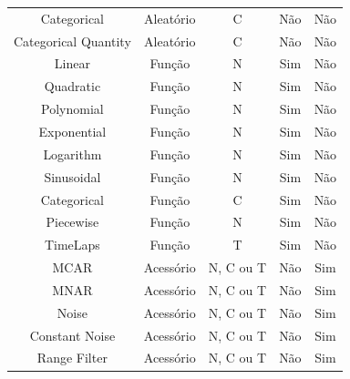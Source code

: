 \documentclass[
	12pt,				%
	openright,			%
	oneside,			%
	a4paper,			%
	english,			%
	brazil				%
	]{abntex2}
\begin{document}
\begin{table}[h]
\begin{tabular}{c|c|c|c|c}
				Categorical          & Aleatório  & C                                         & Não        & Não \\
				Categorical Quantity & Aleatório  & C                                         & Não        & Não \\
				Linear               & Função     & N                                         & Sim        & Não \\
				Quadratic            & Função     & N                                         & Sim        & Não \\
				Polynomial           & Função     & N                                         & Sim        & Não \\
				Exponential          & Função     & N                                         & Sim        & Não \\
				Logarithm            & Função     & N                                         & Sim        & Não \\
				Sinusoidal           & Função     & N                                         & Sim        & Não \\
				Categorical          & Função     & C                                         & Sim        & Não \\
				Piecewise            & Função     & N                                         & Sim        & Não \\
				TimeLaps             & Função     & T                                         & Sim        & Não \\
				MCAR                 & Acessório  & N, C ou T & Não        & Sim \\
				MNAR                 & Acessório  & N, C ou T & Não        & Sim \\
				Noise                & Acessório  & N, C ou T & Não        & Sim \\
				Constant Noise       & Acessório  & N, C ou T & Não        & Sim \\
				Range Filter         & Acessório  & N, C ou T & Não        & Sim \\

\end{tabular}
\end{table}
\end{document}
